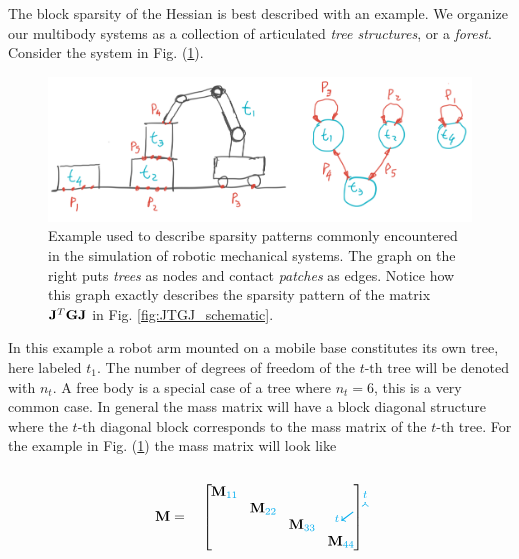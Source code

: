 The block sparsity of the Hessian is best described with an example. We organize
our multibody systems as a collection of articulated \emph{tree structures}, or
a \emph{forest}. Consider the system in Fig. (\ref{fig:sparsity_example}).
\begin{figure}[!h]
	\centering
	\includegraphics[width=0.7\columnwidth]{figures/sparsity_example.png}
	\caption{\label{fig:sparsity_example} 
	Example used to describe sparsity patterns commonly encountered in the
	simulation of robotic mechanical systems. The graph on the right puts
	\textit{trees} as nodes and contact \textit{patches} as edges. Notice how
	this graph exactly describes the sparsity pattern of the matrix
	${\mathbf{J}}^T{\mathbf{G}}{\mathbf{J}}$ in Fig. \ref{fig:JTGJ_schematic}.}
\end{figure}
In this example a robot arm mounted on a mobile base constitutes its own tree,
here labeled $t_1$. The number of degrees of freedom of the $t\text{-th}$ tree
will be denoted with $n_t$. A free body is a special case of a tree where
$n_t=6$, this is a very common case. In general the mass matrix will have a
block diagonal structure where the $t\text{-th}$ diagonal block corresponds to
the mass matrix of the $t\text{-th}$ tree. For the example in Fig.
(\ref{fig:sparsity_example}) the mass matrix will look like\\\\
\begin{equation}
	\mf{M}=\quad
	\begin{bmatrix}
		\tikzmark{M_topleft}
		\diagentry{\mf{M}_{\cc{11}}}&&&\tikzmark{M_topright}\\
		&\diagentry{\mf{M}_{\cc{22}}}\\
		&&\diagentry{\mf{M}_{\cc{33}}}\\		
		\tikzmark{M_bottomleft}&&&\diagentry{\mf{M}_{\cc{44}}}
	\end{bmatrix}
\tikz[overlay,remember picture] {
	\draw[->,thick,color=cyan]
  ([yshift=3ex]M_topleft) -- ([yshift=3ex]M_topright) node[midway,above]
  {\scriptsize $t$}; 
  \draw[->,thick,color=cyan]
  ([yshift=1.5ex,xshift=-2ex]M_topleft) -- ([xshift=-4ex]M_bottomleft)
  node[near end,left] {\scriptsize $t$};}	
\end{equation}

